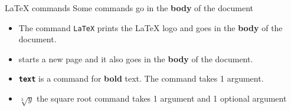 \copyrightTim

\begin{frame}[fragile]{LaTeX commands}
    Some commands go in the \textbf{body} of the document
    \newline
    \begin{itemize}
    \item The command \texttt{\LaTeX} prints the \LaTeX{} logo and goes in the \textbf{body} of the document. \newline

    \item \texttt{\newpage} starts a new page and it also goes in the \textbf{body} of the document.
    \newline

    \item \texttt{\textbf{text}} is a command for \textbf{bold} text. The command takes 1 argument.
    \newline
    \item \texttt{}  \(\sqrt[3]{y}\) the square root command takes 1 argument and 1 optional argument
    \end{itemize}
\end{frame}